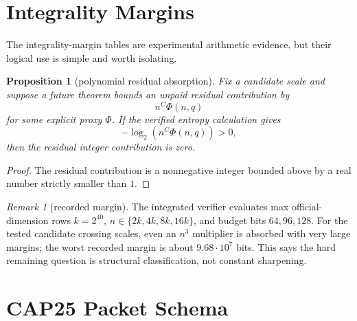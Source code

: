 \documentclass[11pt]{article}
\newtheorem{proposition}[theorem]{Proposition}
\theoremstyle{definition}
\theoremstyle{remark}
\newtheorem{remark}[theorem]{Remark}
\begin{document}
\section{Integrality Margins}

The integrality-margin tables are experimental arithmetic evidence, but their
logical use is simple and worth isolating.

\begin{proposition}[polynomial residual absorption]\label{prop:integrality}
Fix a candidate scale and suppose a future theorem bounds an unpaid residual
contribution by
\[
        n^C \Phi(n,q)
\]
for some explicit proxy $\Phi$.  If the verified entropy calculation gives
\[
        -\log_2(n^C\Phi(n,q))>0,
\]
then the residual integer contribution is zero.
\end{proposition}

\begin{proof}
The residual contribution is a nonnegative integer bounded above by a real
number strictly smaller than $1$.
\end{proof}

\begin{remark}[recorded margin]
The integrated verifier evaluates max official-dimension rows
$k=2^{40}$, $n\in\{2k,4k,8k,16k\}$, and budget bits $64,96,128$.  For the
tested candidate crossing scales, even an $n^3$ multiplier is absorbed with
very large margins; the worst recorded margin is about $9.68\cdot10^7$ bits.
This says the hard remaining question is structural classification, not
constant sharpening.
\end{remark}

\section{CAP25 Packet Schema}
\end{document}
